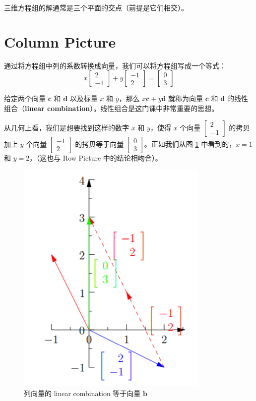 \documentclass[green, cn, normal]{elegantnote}
\begin{document}
	三维方程组的解通常是三个平面的交点（前提是它们相交）。
	
	\section{Column Picture}
	
	通过将方程组中列的系数转换成向量，我们可以将方程组写成一个等式：
	\[
	x \begin{bmatrix}
	2 \\ -1
	\end{bmatrix} + y \begin{bmatrix}
	-1 \\ 2
	\end{bmatrix} = \begin{bmatrix}
	0 \\ 3
	\end{bmatrix}
	\]
	
	给定两个向量 $\textbf{c}$ 和 $\textbf{d}$ 以及标量 $x$ 和 $y$，那么 $x\textbf{c} + y \textbf{d}$ 就称为向量 $\textbf{c}$ 和 $\textbf{d}$ 的线性组合（\textbf{linear combination}）。线性组合是这门课中非常重要的思想。
	
	从几何上看，我们是想要找到这样的数字 $x$ 和 $y$，使得 $x$ 个向量 $\begin{bmatrix}
	2 \\ -1
	\end{bmatrix}$ 的拷贝加上 $y$ 个向量 $\begin{bmatrix}
	-1 \\ 2
	\end{bmatrix}$ 的拷贝等于向量 $\begin{bmatrix}
	0 \\ 3
	\end{bmatrix}$。正如我们从图 \ref{fig:vector} 中看到的，$x=1$ 和 $y=2$，（这也与 Row Picture 中的结论相吻合）。
	
	\begin{figure}[!htbp]
		\centering
		\includegraphics[scale=0.6]{2.png}
		\caption{列向量的 linear combination 等于向量 $\textbf{b}$}
		\label{fig:vector}
	\end{figure}
\end{document}
